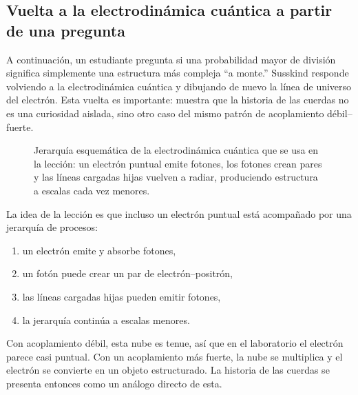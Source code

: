 \subsection{Vuelta a la electrodinámica cuántica a partir de una pregunta}

A continuación, un estudiante pregunta si una probabilidad mayor de división significa simplemente una estructura más compleja ``a monte.'' Susskind responde volviendo a la electrodinámica cuántica y dibujando de nuevo la línea de universo del electrón. Esta vuelta es importante: muestra que la historia de las cuerdas no es una curiosidad aislada, sino otro caso del mismo patrón de acoplamiento débil--fuerte.

\begin{figure}[htbp]
\centering
{}
\caption{Jerarquía esquemática de la electrodinámica cuántica que se usa en la lección: un electrón puntual emite fotones, los fotones crean pares y las líneas cargadas hijas vuelven a radiar, produciendo estructura a escalas cada vez menores.}
\end{figure}

La idea de la lección es que incluso un electrón puntual está acompañado por una jerarquía de procesos:
\begin{enumerate}
\item un electrón emite y absorbe fotones,
\item un fotón puede crear un par de electrón--positrón,
\item las líneas cargadas hijas pueden emitir fotones,
\item la jerarquía continúa a escalas menores.
\end{enumerate}
Con acoplamiento débil, esta nube es tenue, así que en el laboratorio el electrón parece casi puntual. Con un acoplamiento más fuerte, la nube se multiplica y el electrón se convierte en un objeto estructurado. La historia de las cuerdas se presenta entonces como un análogo directo de esta.

